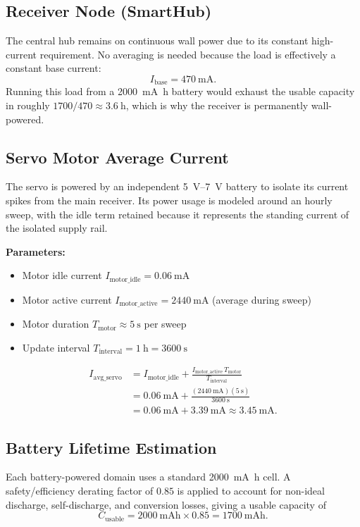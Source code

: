 \documentclass[11pt,letterpaper]{article}
\begin{document}
\subsection{Receiver Node (SmartHub)}
The central hub remains on continuous wall power due to its constant
high-current requirement. No averaging is needed because the load is
effectively a constant base current:
\[
    I_{\text{base}} = \SI{470}{\milli\ampere}.
\]
Running this load from a \SI{2000}{\milli\ampere\hour} battery would
exhaust the usable capacity in roughly
\(1700/470 \approx \SI{3.6}{\hour}\), which is why the receiver is
permanently wall-powered.

\subsection{Servo Motor Average Current}
The servo is powered by an independent \SIrange{5}{7}{\volt} battery
to isolate its current spikes from the main receiver. Its power usage
is modeled around an hourly sweep, with the idle term retained because
it represents the standing current of the isolated supply rail.

\textbf{Parameters:}
\begin{itemize}[leftmargin=*]
    \item Motor idle current
          \(I_{\text{motor\_idle}} = \SI{0.06}{\milli\ampere}\)
    \item Motor active current
          \(I_{\text{motor\_active}} = \SI{2440}{\milli\ampere}\)
          (average during sweep)
    \item Motor duration \(T_{\text{motor}} \approx \SI{5}{\second}\)
          per sweep
    \item Update interval
          \(T_{\text{interval}} = \SI{1}{\hour} = \SI{3600}{\second}\)
\end{itemize}

\begin{align*}
I_{\text{avg\_servo}}
&= I_{\text{motor\_idle}}
   + \frac{I_{\text{motor\_active}}\,T_{\text{motor}}}
          {T_{\text{interval}}} \\[4pt]
&= \SI{0.06}{\milli\ampere}
   + \frac{(\SI{2440}{\milli\ampere})(\SI{5}{\second})}
          {\SI{3600}{\second}} \\[4pt]
&= \SI{0.06}{\milli\ampere} + \SI{3.39}{\milli\ampere}
 \approx \SI{3.45}{\milli\ampere}.
\end{align*}

\subsection{Battery Lifetime Estimation}
Each battery-powered domain uses a standard
\SI{2000}{\milli\ampere\hour} cell. A safety/efficiency derating
factor of \(0.85\) is applied to account for non-ideal discharge,
self-discharge, and conversion losses, giving a usable capacity of
\[
    C_{\text{usable}} = \SI{2000}{\milli\ampere\hour} \times 0.85
                     = \SI{1700}{\milli\ampere\hour}.
\]
\end{document}
